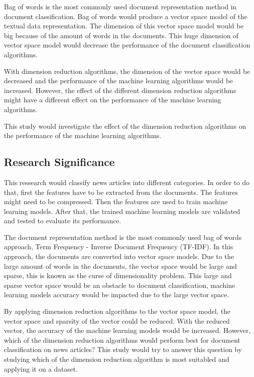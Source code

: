 Bag of words is the most commonly used document representation method in document classification. Bag of words would produce a vector space model of the textual data representation. The dimension of this vector space model would be big because of the amount of words in the documents. This huge dimension of vector space model would decrease the performance of the document classification algorithms. 

With dimension reduction algorithms, the dimension of the vector space would be decreased and the performance of the machine learning algorithms would be increased. However, the effect of the different dimension reduction algorithms might have a different effect on the performance of the machine learning algorithms.

This study would investigate the effect of the dimension reduction algorithms on the performance of the machine learning algorithms. 

\subsection{Research Significance}
This ressearch would classify news articles into different categories. In order to do that, first the features have to be extracted from the documents. The features might need to be compressed. Then the features are used to train machine learning models. After that, the trained machine learning models are validated and tested to evaluate its performance. 

The document representation method is the most commonly used bag of words approach, Term Frequency - Inverse Document Frequency (TF-IDF). In this approach, the documents are converted into vector space models. Due to the large amount of words in the documents, the vector space would be large and sparse, this is known as the curse of dimensionality problem. This large and sparse vector space would be an obstacle to document classification, machine learning models accuracy would be impacted due to the large vector space.

By applying dimension reduction algorithms to the vector space model, the vector space and sparsity of the vector could be reduced. With the reduced vector, the accuracy of the machine learning models would be increased. However, which of the dimension reduction algorithms would perform best for document classification on news articles? This study would try to answer this question by studying which of the dimension reduction algorithm is most suitabled and applying it on a dataset.

